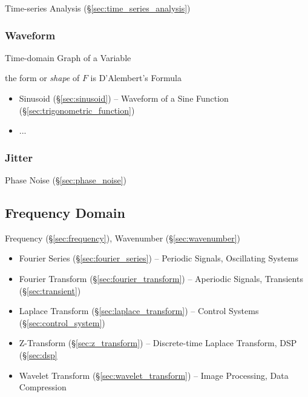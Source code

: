 \fist Time-series Analysis (\S\ref{sec:time_series_analysis})



\subsubsection{Waveform}\label{sec:waveform}

Time-domain Graph of a Variable

the form or \emph{shape} of $F$ is D'Alembert's Formula

\begin{itemize}
  \item Sinusoid (\S\ref{sec:sinusoid}) -- Waveform of a Sine Function
    (\S\ref{sec:trigonometric_function})
  \item ...
\end{itemize}



\subsubsection{Jitter}\label{sec:jitter}

Phase Noise (\S\ref{sec:phase_noise})



\subsection{Frequency Domain}\label{sec:frequency_domain}

Frequency (\S\ref{sec:frequency}), Wavenumber (\S\ref{sec:wavenumber})

\begin{itemize}
  \item Fourier Series (\S\ref{sec:fourier_series}) -- Periodic Signals,
    Oscillating Systems
  \item Fourier Transform (\S\ref{sec:fourier_transform}) -- Aperiodic Signals,
    Transients (\S\ref{sec:transient})
  \item Laplace Transform (\S\ref{sec:laplace_transform}) -- Control Systems
    (\S\ref{sec:control_system})
  \item Z-Transform (\S\ref{sec:z_transform}) -- Discrete-time Laplace
    Transform, DSP (\S\ref{sec:dsp}
  \item Wavelet Transform (\S\ref{sec:wavelet_transform}) -- Image Processing,
    Data Compression
\end{itemize}

